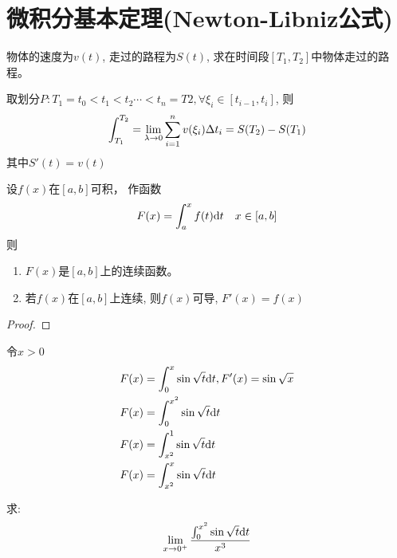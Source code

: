 \section{微积分基本定理(Newton-Libniz公式)}
\begin{example}[变速运动]
    物体的速度为$v(t)$, 走过的路程为$S(t)$, 求在时间段$[T_1, T_2]$中物体走过的路程。
\end{example}
\begin{solution}
    取划分$P: T_1 = t_0 < t_1 < t_2 \cdots < t_n = T2, \forall \xi_i \in [t_{i-1}, t_i]$, 则
    \begin{equation*}
        \int_{T_1}^{T_2} = \lim_{\lambda \to 0 } \sum_{i=1}^{n}v(\xi_i) \Delta t_i = S(T_2) - S(T_1)
    \end{equation*}
    其中$S'(t) = v(t)$
\end{solution}

\begin{theorem}
    设$f(x)$在$[a, b]$可积， 作函数
    \begin{equation*}
        F(x) = \int_{a}^{x} f(t) \mathrm{d} t \quad x \in [a, b]
    \end{equation*}
    则
    \begin{enumerate}
        \item $F(x)$是$[a, b]$上的连续函数。
        \item 若$f(x)$在$[a, b]$上连续, 则$f(x)$可导, $F'(x) = f(x)$
    \end{enumerate}
\end{theorem}
\begin{proof}
    
\end{proof}

\begin{example}
    令$x > 0$
    \begin{align}
        F(x) &= \int_0^x \sin\sqrt{t} \D t , F'(x) = \sin\sqrt{x} \\
        F(x) &= \int_0^{x^2}\sin\sqrt{t} \D t \\
        F(x) &= \int_{x^2}^1\sin\sqrtsign{t} \D t \\
        F(x) &= \int_{x^2}^x\sin\sqrtsign{t} \D t
    \end{align}
\end{example}
\begin{solution}
    
\end{solution}

\begin{example}
    求:
    \begin{equation*}
        \lim_{x \to 0^+ } \frac{\int_{0}^{x^2}\sin\sqrt{t}\mathrm{d} t}{x^3}
    \end{equation*}
\end{example}

